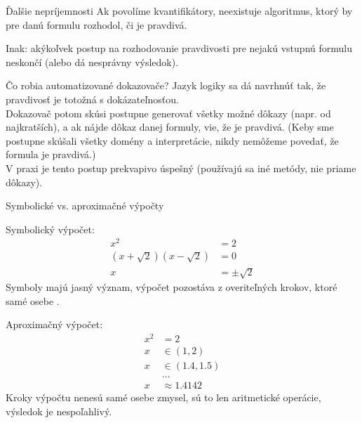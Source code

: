 \documentclass[12pt]{beamer}
\theoremstyle{definition}
\begin{document}
\begin{frame}{Ďalšie nepríjemnosti}
Ak povolíme kvantifikátory, \alert{neexistuje algoritmus}, ktorý by pre danú formulu rozhodol, či je pravdivá.

Inak: akýkoľvek postup na rozhodovanie pravdivosti pre nejakú vstupnú formulu neskončí (alebo dá nesprávny výsledok).
\end{frame}

\begin{frame}{Čo robia automatizované dokazovače?}
Jazyk logiky sa dá navrhnúť tak, že pravdivosť je totožná s dokázateľnosťou.\\[3mm]

Dokazovač potom skúsi postupne generovať všetky možné dôkazy (napr. od najkratších), a ak nájde dôkaz danej formuly, vie, že je pravdivá.
(Keby sme postupne skúšali všetky domény a interpretácie, nikdy nemôžeme povedať, že formula je pravdivá.)\\[3mm]

V praxi je tento postup prekvapivo úspešný (používajú sa iné metódy, nie priame dôkazy).
\end{frame}

\begin{frame}{Symbolické vs. aproximačné výpočty}
\begin{minipage}[t]{0.45\textwidth}
Symbolický výpočet:
\begin{align*}
	x^2 &= 2\\
	(x+\sqrt 2)(x-\sqrt 2) &= 0\\
	x &= \pm\sqrt 2
\end{align*}
Symboly majú jasný význam, výpočet pozostáva z overiteľných krokov, ktoré samé osebe .
\end{minipage}
\quad
\begin{minipage}[t]{0.45\textwidth}
Aproximačný výpočet:
\begin{align*}
	x^2 &= 2\\
	x &\in (1, 2)\\
	x &\in (1.4, 1.5)\\
	  &\dots\\
	x &\approx 1.4142
\end{align*}
Kroky výpočtu nenesú samé osebe zmysel, sú to len aritmetické operácie, výsledok je nespoľahlivý.
\end{minipage}
\end{frame}
\end{document}

